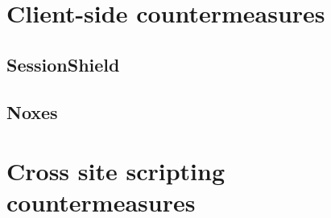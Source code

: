 
\section{Client-side countermeasures}%

\subsection{SessionShield}\label{sessionshield}

\cite{Nikiforakis2010}

\subsection{Noxes}

\cite{Kirda2006}

\section{Cross site scripting countermeasures}\label{xss-countermeasures}


